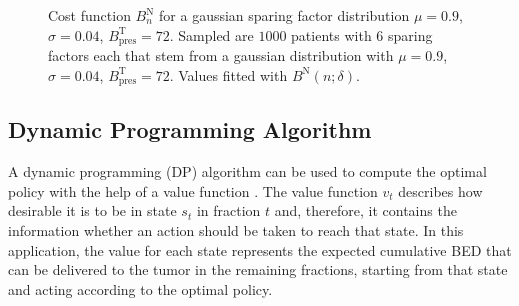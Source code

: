 \documentclass[\relativeRoot/ada.tex]{subfiles}
\begin{document}
\begin{figure}[!htb]
    
\caption{Cost function $B^{\text{N}}_n$ for a gaussian sparing factor distribution $\mu=0.9$, $\sigma=0.04$, $B_{\text{pres}}^{\text{T}}=72$. Sampled are $1000$ patients with 6 sparing factors each that stem from a gaussian distribution with $\mu=0.9$, $\sigma=0.04$, $B_{\text{pres}}^{\text{T}}=72$. Values fitted with $B^{\text{N}}(n; \delta)$.}
\label{fig:cost_function}
\end{figure}


\subsection{Dynamic Programming Algorithm}
\label{sec:DP}
A dynamic programming (DP) algorithm can be used to compute the optimal policy with the help of a value function \cite{sutton_reinforcement}. The value function $v_t$ describes how desirable it is to be in state $s_t$ in fraction $t$ and, therefore, it contains the information whether an action should be taken to reach that state. In this application, the value for each state represents the expected cumulative BED that can be delivered to the tumor in the remaining fractions, starting from that state and acting according to the optimal policy.\\
\end{document}
